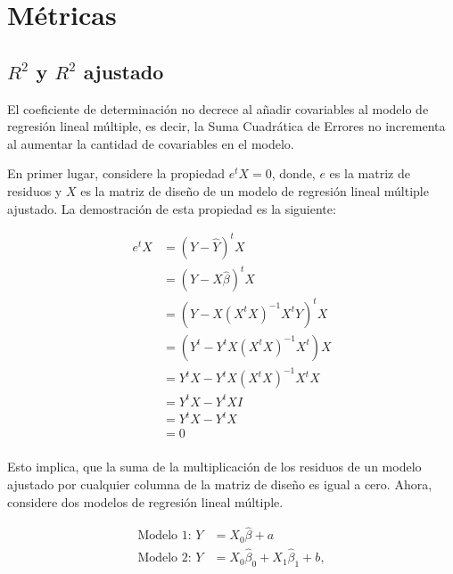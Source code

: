 \documentclass[
  11pt,
]{book}
\theoremstyle{definition}
\theoremstyle{definition}
\theoremstyle{definition}
\theoremstyle{definition}
\theoremstyle{remark}
\begin{document}
\chapter{Métricas}\label{muxe9tricas}

\section{\texorpdfstring{\(R^2\) y \(R^2\) ajustado}{R\^{}2 y R\^{}2 ajustado}}\label{R2-no-decreciente}

El coeficiente de determinación no decrece al añadir covariables al modelo de regresión lineal múltiple, es decir, la Suma Cuadrática de Errores no incrementa al aumentar la cantidad de covariables en el modelo.

En primer lugar, considere la propiedad \(e^tX = 0\), donde, \(e\) es la matriz de residuos y \(X\) es la matriz de diseño de un modelo de regresión lineal múltiple ajustado. La demostración de esta propiedad es la siguiente:

\begin{equation}
\begin{split}
e^tX &= (Y - \widehat{Y})^tX\\
&= (Y - X\widehat{\beta})^tX\\
&= (Y - X(X^tX)^{-1}X^tY)^tX\\
&= (Y^t - Y^tX(X^tX)^{-1}X^t)X\\
&= Y^tX - Y^tX(X^tX)^{-1}X^tX\\
&= Y^tX - Y^tXI\\
&= Y^tX - Y^tX\\
&= 0\\
\end{split}
\label{eq:propiedad-residuos}
\end{equation}

Esto implica, que la suma de la multiplicación de los residuos de un modelo ajustado por cualquier columna de la matriz de diseño es igual a cero. Ahora, considere dos modelos de regresión lineal múltiple.

\begin{equation}
\begin{split}
\text{Modelo 1: } Y &= X_0\widehat{\beta} + a\\
\text{Modelo 2: } Y &= X_0\widehat{\beta}_0 + X_1\widehat{\beta}_1 + b,\\
\end{split}
\label{eq:R2-RLM1y2}
\end{equation}
\end{document}
